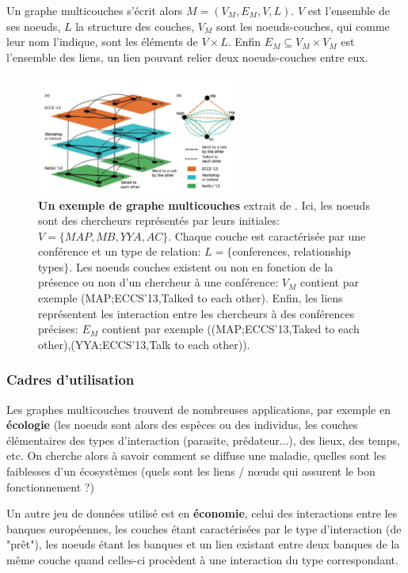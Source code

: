 \documentclass[11pt,a4paper]{article}
\theoremstyle{definition}
\theoremstyle{remark}
\theoremstyle{remark}
\begin{document}
 Un graphe multicouches s'écrit alors $M = (V_M, E_M, V, L)$. $V$ est l'ensemble de ses noeuds, $L$ la structure des couches, $V_M$ sont les noeuds-couches, qui comme leur nom l'indique, sont les éléments de $V\times L$. Enfin $E_M \subseteq V_M \times V_M $ est l'ensemble des liens, un lien pouvant relier deux noeuds-couches entre eux. 

\begin{figure}[H]
	\centering
	\includegraphics[width=0.6\textwidth]{exmultilayer.JPG}
	\caption{\textbf{Un exemple de graphe multicouches} extrait de \cite{mlkiv}. Ici, les noeuds sont des chercheurs représentés par leurs initiales: $V = \{MAP,MB,YYA,AC\}$. Chaque couche est caractérisée par une conférence et un type de relation: $L = \{$conferences, relationship types$\}$. Les noeuds couches existent ou non en fonction de la présence ou non d'un chercheur à une conférence: $V_M$ contient par exemple (MAP;ECCS'13,Talked to each other). Enfin, les liens représentent les interaction entre les chercheurs à des conférences précises: $E_M$ contient par exemple ((MAP;ECCS'13,Taked to each other),(YYA;ECCS'13,Talk to each other)). }

\end{figure}

\subsubsection{Cadres d'utilisation}


Les graphes multicouches trouvent de nombreuses applications, par exemple en \textbf{écologie} \cite{ecolo} (les noeuds sont alors des espèces ou des individus, les couches élémentaires des types d'interaction (parasite, prédateur...), des lieux, des temps, etc. On cherche alors à savoir comment se diffuse une maladie, quelles sont les faiblesses d'un écosystèmes (quels sont les liens / nœuds qui assurent le bon fonctionnement ?)

Un autre jeu de données utilisé est en \textbf{économie}, celui des interactions entre les banques européennes, les couches étant caractérisées par le type d'interaction (de "prêt"), les noeuds étant les banques et un lien existant entre deux banques de la même couche quand celles-ci procèdent à une interaction du type correspondant.
\end{document}
